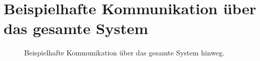 \section{Beispielhafte Kommunikation über das gesamte System}\label{ExCom}
\begin{figure}[htb]
\centering
{}
\caption{Beispielhafte Kommunikation über das gesamte System hinweg.}
\label{fig:KomGes}
\end{figure}